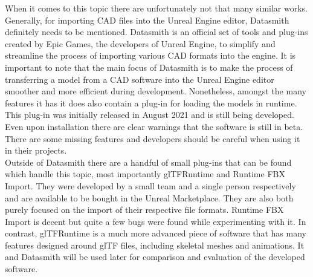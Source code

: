 When it comes to this topic there are unfortunately not that many similar works. Generally, for importing \acs{CAD} files into the Unreal Engine editor, Datasmith definitely needs to be mentioned. Datasmith is an official set of tools and plug-ins created by Epic Games, the developers of Unreal Engine, to simplify and streamline the process of importing various \acs{CAD} formats into the engine\cite{bib:DSDoc}. It is important to note that the main focus of Datasmith is to make the process of transferring a model from a \acs{CAD} software into the Unreal Engine editor smoother and more efficient during development. Nonetheless, amongst the many features it has it does also contain a plug-in for loading the models in runtime\cite{bib:DSRunDoc}. This plug-in was initially released in August 2021 and is still being developed. Even upon installation there are clear warnings that the software is still in beta. There are some missing features and developers should be careful when using it in their projects.\\
Outside of Datasmith there are a handful of small plug-ins that can be found which handle this topic, most importantly glTFRuntime\cite{bib:glTFRun} and Runtime FBX Import\cite{bib:FBXRun}. They were developed by a small team and a single person respectively and are available to be bought in the Unreal Marketplace. They are also both purely focused on the import of their respective file formats. Runtime \acs{FBX} Import is decent but quite a few bugs were found while experimenting with it. In contrast, glTFRuntime is a much more advanced piece of software that has many features designed around \acs{glTF} files, including skeletal meshes and animations. It and Datasmith will be used later for comparison and evaluation of the developed software.